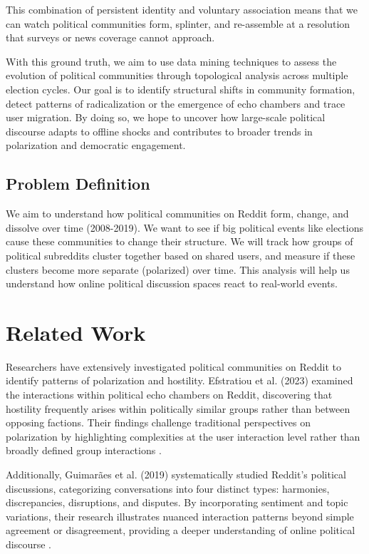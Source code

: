 \documentclass{article}
\theoremstyle{definition}
\begin{document}
This combination of persistent identity and voluntary association means that we can watch political communities form, splinter, and re-assemble at a resolution that surveys or news coverage cannot approach.

With this ground truth, we aim to use data mining techniques to assess the evolution of political communities through topological analysis across multiple election cycles. Our goal is to identify structural shifts in community formation, detect patterns of radicalization or the emergence of echo chambers and trace user migration. By doing so, we hope to uncover how large-scale political discourse adapts to offline shocks and contributes to broader trends in polarization and democratic engagement.


\subsection{Problem Definition}
We aim to understand how political communities on Reddit form, change, and dissolve over time (2008-2019). We want to see if big political events like elections cause these communities to change their structure. We will track how groups of political subreddits cluster together based on shared users, and measure if these clusters become more separate (polarized) over time. This analysis will help us understand how online political discussion spaces react to real-world events.

\section{Related Work}

Researchers have extensively investigated political communities on Reddit to identify patterns of polarization and hostility. Efstratiou et al. (2023) examined the interactions within political echo chambers on Reddit, discovering that hostility frequently arises within politically similar groups rather than between opposing factions. Their findings challenge traditional perspectives on polarization by highlighting complexities at the user interaction level rather than broadly defined group interactions \cite{efstratiou2023non}.

Additionally, Guimarães et al. (2019) systematically studied Reddit’s political discussions, categorizing conversations into four distinct types: harmonies, discrepancies, disruptions, and disputes. By incorporating sentiment and topic variations, their research illustrates nuanced interaction patterns beyond simple agreement or disagreement, providing a deeper understanding of online political discourse \cite{guimaraes2019analyzing}.
\end{document}
